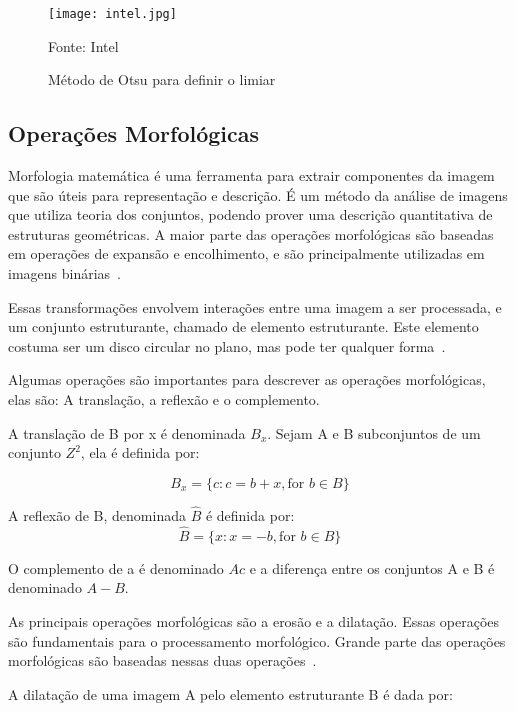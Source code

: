\begin{figure}[H]
	\centering
	\texttt{[image: intel.jpg]}
	\caption{Método de Otsu para definir o limiar}
Fonte: Intel~\cite{intel2017dev}
	\label{fig:otsu_ex}
\end{figure}

\subsection{Operações Morfológicas}
\label{sec:morfologicas}

Morfologia matemática é uma ferramenta para extrair componentes da imagem que
são úteis para representação e descrição. É um método da análise de imagens que
utiliza teoria dos conjuntos, podendo prover uma descrição quantitativa de
estruturas geométricas. A maior parte das operações morfológicas são baseadas em
operações de expansão e encolhimento, e são principalmente utilizadas em imagens
binárias~\cite{owens1997morphology}.

Essas transformações envolvem interações entre uma imagem a ser processada, e um
conjunto estruturante, chamado de elemento estruturante. Este elemento costuma
ser um disco circular no plano, mas pode ter qualquer
forma~\cite{owens1997morphology}.

Algumas operações são importantes para descrever as operações morfológicas, elas
são: A translação, a reflexão e o complemento.

A translação de B por x é denominada \(B_x\). Sejam A e B subconjuntos de um
conjunto \(Z^2\), ela é definida por:

\begin{displaymath}
B_x = \{c : c = b + x, \mbox{for } b \in B\}
\end{displaymath}

A reflexão de B, denominada $\hat{B}$ é definida por:
\begin{displaymath}
\hat{B} = \{x : x = -b, \mbox{for } b \in B\}
\end{displaymath}

O complemento de a é denominado $Ac$ e a diferença entre os conjuntos A e B é
denominado $A-B$.

As principais operações morfológicas são a erosão e a dilatação. Essas operações
são fundamentais para o processamento morfológico. Grande parte das operações
morfológicas são baseadas nessas duas operações~\cite{gonzalez1977digital}.

A dilatação de uma imagem A pelo elemento estruturante B é dada por:

